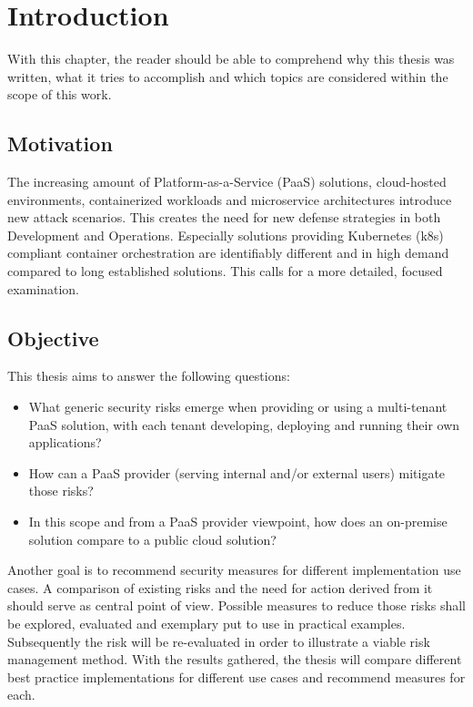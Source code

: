\chapter{Introduction}
With this chapter, the reader should be able to comprehend why this thesis was written, 
what it tries to accomplish and which topics are considered within the scope of this work.

\section{Motivation}

The increasing amount of Platform-as-a-Service (PaaS) solutions, cloud-hosted environments, containerized workloads and microservice architectures introduce new attack scenarios. 
This creates the need for new defense strategies in both Development and Operations. 
Especially solutions providing Kubernetes (k8s) compliant container orchestration are identifiably different and in high demand compared to long established solutions. 
This calls for a more detailed, focused examination. 

\section{Objective} \label{goal}

This thesis aims to answer the following questions:

\begin{itemize}

\item What generic security risks emerge when providing or using a multi-tenant PaaS solution,
with each tenant developing, deploying and running their own applications? 

\item How can a PaaS provider (serving internal and/or external users) mitigate those risks? 

\item  In this scope and from a PaaS provider viewpoint, how does an on-premise solution compare
to a public cloud solution? 

\end{itemize}

Another goal is to recommend security measures for different implementation use cases.
A comparison of existing risks and the need for action derived from it should serve as central point of view. 
Possible measures to reduce those risks shall be explored, evaluated and exemplary put to use in practical examples.
Subsequently the risk will be re-evaluated in order to illustrate a viable risk management method.
With the results gathered, the thesis will compare different best practice implementations for different use cases and recommend measures for each.

